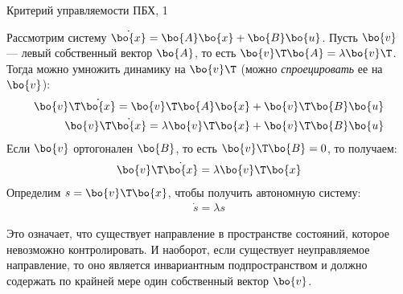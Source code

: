 \documentclass{beamer}
\begin{document}
\begin{frame}{Критерий управляемости ПБХ, 1}
	\begin{flushleft}
		
		Рассмотрим систему $\dot{\bo{x}}=\bo{A}\bo{x}+\bo{B}\bo{u}$. Пусть $\bo{v}$ — левый собственный вектор $\bo{A}$, то есть $\bo{v}\T \bo{A} = \lambda \bo{v}\T$. Тогда можно умножить динамику на $\bo{v}\T$ (можно \emph{спроецировать} ее на $\bo{v}$):
		\begin{align}
			\bo{v}\T \dot{\bo{x}}=\bo{v}\T \bo{A}\bo{x}+\bo{v}\T \bo{B}\bo{u}
			\\
			\bo{v}\T \dot{\bo{x}}=\lambda \bo{v}\T \bo{x}+\bo{v}\T \bo{B}\bo{u}
		\end{align}
		Если $\bo{v}$ ортогонален $\bo{B}$, то есть $\bo{v}\T\bo{B} = 0$, то получаем:
		\begin{align}
			\bo{v}\T \dot{\bo{x}}=\lambda \bo{v}\T \bo{x}
		\end{align}
		Определим $s = \bo{v}\T \bo{x}$, чтобы получить автономную систему:
		\begin{align}
			\dot{s}=\lambda s
		\end{align}
		
		Это означает, что существует направление в пространстве состояний, которое невозможно контролировать. И наоборот, если существует неуправляемое направление, то оно является инвариантным подпространством и должно содержать по крайней мере один собственный вектор $\bo{v}$.
		
	\end{flushleft}
\end{frame}
\end{document}
